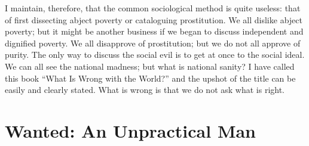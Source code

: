 \documentclass{book}
\begin{document}
I maintain, therefore, that the common sociological method is quite useless: that of first dissecting abject poverty or cataloguing prostitution. We all dislike abject poverty; but it might be another business if we began to discuss independent and dignified poverty. We all disapprove of prostitution; but we do not all approve of purity. The only way to discuss the social evil is to get at once to the social ideal. We can all see the national madness; but what is national sanity? I have called this book “What Is Wrong with the World?” and the upshot of the title can be easily and clearly stated. What is wrong is that we do not ask what is right.

\chapter{Wanted: An Unpractical Man}
\label{chapter-3}
\end{document}
